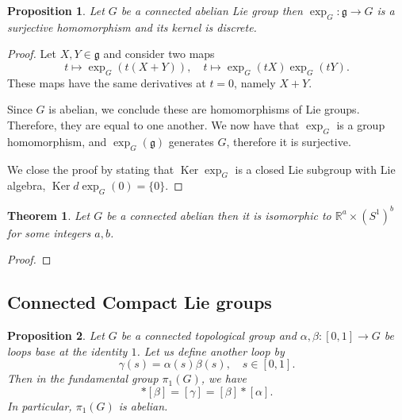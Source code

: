\documentclass{article}
\newtheorem{theorem}{Theorem}[section]
\newtheorem{proposition}{Proposition}[section]
\numberwithin{equation}{section}
\DeclareMathOperator{\Ker}{Ker}
\begin{document}
\begin{proposition}
Let $G$ be a connected abelian Lie group then $\exp_G:\mathfrak{g}\to G$ is a surjective homomorphism and its kernel is discrete.
\end{proposition}

\begin{proof}
Let $X,Y\in\mathfrak{g}$ and consider two maps
\begin{equation*}
t\mapsto\exp_G(t(X+Y)),\quad t\mapsto\exp_G(tX)\exp_G(tY).
\end{equation*}
These maps have the same derivatives at $t=0$, namely $X+Y$.\\ %
\par Since $G$ is abelian, we conclude these are homomorphisms of Lie groups. Therefore, they are equal to one another. We now have that $\exp_G$ is a group homomorphism, and $\exp_G(\mathfrak{g})$ generates $G$, therefore it is surjective. \\
\par We close the proof by stating that $\Ker\exp_G$ is a closed Lie subgroup with Lie algebra, $\Ker d\exp_G(0)=\{0\}$.
\end{proof}

\begin{theorem}
Let $G$ be a connected abelian then it is isomorphic to $\mathbb{R}^a\times (S^1)^b$ for some integers $a,b$.
\end{theorem}

\begin{proof}
\end{proof}

\subsection{Connected Compact Lie groups}

\begin{proposition}
Let $G$ be a connected topological group and $\alpha,\beta:[0,1]\to G$ be loops base at the identity $1$. Let us define another loop by
\begin{equation*}
\gamma(s) = \alpha(s)\beta(s), \quad s\in[0,1].
\end{equation*}
Then in the fundamental group $\pi_1(G)$,  we have
\begin{equation*}
[\alpha]*[\beta] = [\gamma]=[\beta]*[\alpha].
\end{equation*}
In particular, $\pi_1(G)$ is abelian.
\end{proposition}
\end{document}
